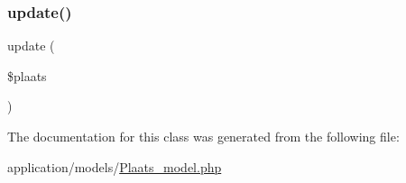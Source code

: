 \subsubsection{\texorpdfstring{update()}{update()}}
{\footnotesize\ttfamily update (\begin{DoxyParamCaption}\item[{}]{\$plaats }\end{DoxyParamCaption})}



The documentation for this class was generated from the following file\+:\begin{DoxyCompactItemize}
\item 
application/models/\mbox{\hyperlink{_plaats__model_8php}{Plaats\+\_\+model.\+php}}\end{DoxyCompactItemize}
